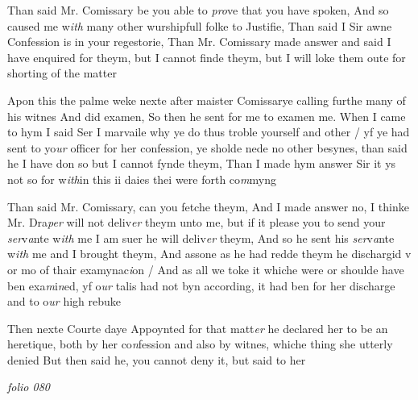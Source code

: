 \documentclass[12pt, a4paper]{book}
\begin{document}
		
		\ifthenelse{\isodd{\thepage}}
		{\reversemarginpar}
		{\normalmarginpar}
		Than said Mr. Comissary be you able to \textit{pro}ve that
 you have spoken, And so caused me w\textit{ith} many other
 wurshipfull folke to Justifie, Than said I Sir awne
			Confession is in your regestorie, Than Mr. Comissary
  made answer and said I have enquired for theym, but
 I cannot finde theym, but I will loke them oute for
 shorting of the matter
	
		
				\marginpar[\vspace{0.5cm}{\textcolor{Gray}{n}}]{}
			
		
		\ifthenelse{\isodd{\thepage}}
		{\reversemarginpar}
		{\normalmarginpar}
		Apon this the palme weke nexte after maister
			Comissarye calling furthe many of his witnes
 And did examen, So then he sent for me to examen
 me. When I came to hym I said Ser I marvaile
 why ye do thus troble yourself and other / yf ye
 had sent to yo\textit{ur }officer for her confession, ye sholde nede
  no other besynes, than said he I have don so but I
 cannot fynde theym, Than I made hym answer Sir
 it ys not so for w\textit{ith}in this ii daies thei were forth co\textit{m}myng
	
	
		\ifthenelse{\isodd{\thepage}}
		{\reversemarginpar}
		{\normalmarginpar}
		Than said Mr. Comissary, can you fetche theym, And
		I made answer no, I thinke Mr. Dra\textit{per} will not deliv\textit{er}
 theym unto me, but if it please you to send your \textit{ser}v\textit{a}nte
 w\textit{ith} me I am suer he will deliv\textit{er} theym, And so he sent
 his \textit{ser}v\textit{a}nte w\textit{ith} me and I brought theym, And assone as
 he had redde theym he dischargid v or mo of thair
 examynac\textit{i}on / And as all we toke it whiche were or
 shoulde have ben exa\textit{m}i\textit{n}ed, yf o\textit{ur} talis had not byn
 according, it had ben for her discharge and to o\textit{ur} high
 rebuke
 
		\ifthenelse{\isodd{\thepage}}
		{\reversemarginpar}
		{\normalmarginpar}
		Then nexte Courte daye Appoynted for that matt\textit{er}
 he declared her to be an heretique, both by her co\textit{n}fession
 and also by witnes, whiche thing she utterly denied
 But then said he, you cannot deny it, but said to her


\dotfill
					

\textit{folio 080}


	
		
				\marginpar[\vspace{0.5cm}{\textcolor{Gray}{n}}]{}
			
\end{document}
